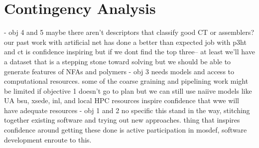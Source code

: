 \section*{Contingency Analysis}

- obj 4 and 5 maybe there aren't descriptors that classify good CT or assemblers? our past work with artificial net has done a better than expected job with p3ht and ct is confidence inspiring but if we dont find the top three-- at least we'll have a dataset that is a stepping stone toward solving but we should be able to generate features of NFAs and polymers
- obj 3 needs models and  access to computational resources. some of the coarse graining and pipelining work might be limited if objective 1 doesn't go to plan but we can still use naiive models like UA bsu, xsede, inl, and local HPC resources inspire confidence that wwe will have adequate resources 
- obj 1 and 2 no specific this stand in the way, stitching together existing software and trying out new approaches. thing that inspires confidence around getting these done is active participation in mosdef, software development enroute to this.

